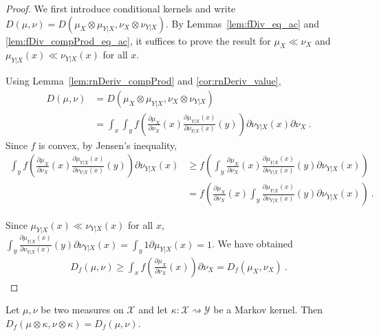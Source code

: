 \begin{proof}
We first introduce conditional kernels and write $D(\mu, \nu) = D(\mu_X \otimes \mu_{Y|X}, \nu_X \otimes \nu_{Y|X})$. By Lemmas~\ref{lem:fDiv_eq_ac} and \ref{lem:fDiv_compProd_eq_ac}, it suffices to prove the result for $\mu_X \ll \nu_X$ and $\mu_{Y|X}(x) \ll \nu_{Y|X}(x)$ for all $x$.

Using Lemma~\ref{lem:rnDeriv_compProd} and \ref{cor:rnDeriv_value},
\begin{align*}
D(\mu, \nu)
&= D(\mu_X \otimes \mu_{Y|X}, \nu_X \otimes \nu_{Y|X})
\\
&= \int_x \int_y f \left( \frac{\partial \mu_X}{\partial\nu_X}(x) \frac{\partial \mu_{Y|X}(x)}{\partial\nu_{Y|X}(x)}(y) \right) \partial \nu_{Y|X}(x) \partial \nu_X
\: .
\end{align*}
Since $f$ is convex, by Jensen's inequality,
\begin{align*}
\int_y f \left( \frac{\partial \mu_X}{\partial\nu_X}(x) \frac{\partial \mu_{Y|X}(x)}{\partial\nu_{Y|X}(x)}(y) \right) \partial \nu_{Y|X}(x)
&\ge f \left( \int_y \frac{\partial \mu_X}{\partial\nu_X}(x) \frac{\partial \mu_{Y|X}(x)}{\partial\nu_{Y|X}(x)}(y) \partial \nu_{Y|X}(x) \right)
\\
&= f \left( \frac{\partial \mu_X}{\partial\nu_X}(x) \int_y \frac{\partial \mu_{Y|X}(x)}{\partial\nu_{Y|X}(x)}(y) \partial \nu_{Y|X}(x) \right)
\: .
\end{align*}

Since $\mu_{Y|X}(x) \ll \nu_{Y|X}(x)$ for all $x$, $\int_y \frac{\partial \mu_{Y|X}(x)}{\partial\nu_{Y|X}(x)}(y) \partial \nu_{Y|X}(x) = \int_y 1 \partial \mu_{Y|X}(x) = 1$. We have obtained
\begin{align*}
D_f(\mu, \nu)
\ge \int_x f \left( \frac{\partial \mu_X}{\partial\nu_X}(x)\right) \partial \nu_X
= D_f(\mu_X, \nu_X)
\: .
\end{align*}

\end{proof}

\begin{lemma}
  \label{thm:fDiv_compProd_right}
  Let $\mu, \nu$ be two measures on $\mathcal X$ and let $\kappa : \mathcal X \rightsquigarrow \mathcal Y$ be a Markov kernel.
  Then $D_f(\mu \otimes \kappa, \nu \otimes \kappa) = D_f(\mu, \nu)$.
\end{lemma}

